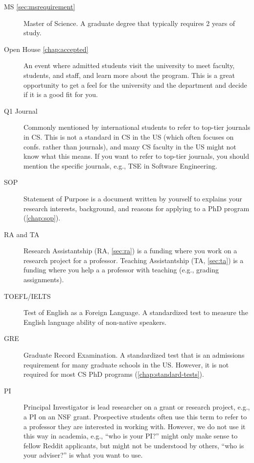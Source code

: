 \documentclass[oneside,11pt,dvipsnames]{book}
\begin{document}
\begin{description}
  \item[MS \autoref{sec:msrequirement}] Master of Science. A graduate degree that typically requires 2 years of study.

  \item[Open House \autoref{chap:accepted}] An event where admitted students visit the university to meet faculty, students, and staff, and learn more about the program. This is a great opportunity to get a feel for the university and the department and decide if it is a good fit for you.
  
  \item[Q1 Journal] Commonly mentioned by international students to refer to top-tier journals in CS.  This is not a standard in CS in the US (which often focuses on confs. rather than journals), and many CS faculty in the US might not know what this means.  If you want to refer to top-tier journals, you should mention the specific journals, e.g., TSE in Software Engineering.
  
  \item[SOP] Statement of Purpose is a document written by yourself to explains your research interests, background, and reasons for applying to a PhD program (\autoref{chap:sop}).

  \item[RA and TA] Research Assistantship (RA, \autoref{sec:ra}) is a funding where you work on a research project for a professor. Teaching Assistantship (TA, \autoref{sec:ta}) is a funding where you help a a professor with teaching (e.g., grading assignments).

  \item[TOEFL/IELTS] Test of English as a Foreign Language. A standardized test to measure the English language ability of non-native speakers.
  \item[GRE] Graduate Record Examination. A standardized test that is an admissions requirement for many graduate schools in the US. However, it is not required for most CS PhD programs (\autoref{chap:standard-tests}).

  \item [PI]  Principal Investigator is lead researcher on a grant or research project, e.g., a PI on an NSF grant.  Prospective students often use this term to refer to a professor they are interested in working with.  However, we do not use it this way in academia, e.g., ``who is your PI?'' might only make sense to fellow Reddit applicants, but might not be understood by others, ``who is your adviser?'' is what you want to use.


\end{description}
\end{document}

